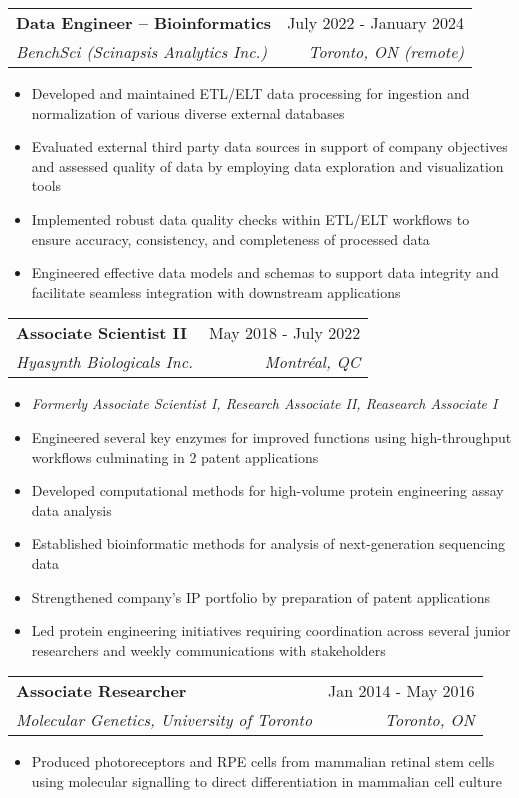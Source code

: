 \documentclass[letterpaper,11pt]{article}
\makeatletter
\newcommand{\resumeItem}[1]{
  \item\small{
    {#1 \vspace{-2pt}}
  }
}
\newcommand{\resumeSubheading}[4]{
  \vspace{-2pt}\item
    \begin{tabular*}{0.97\textwidth}[t]{l@{\extracolsep{\fill}}r}
      \textbf{#1} & #2 \\
      \textit{\small#3} & \textit{\small #4} \\
    \end{tabular*}\vspace{-7pt}
}
\newcommand{\resumeSubSubheading}[2]{
    \item
    \begin{tabular*}{0.97\textwidth}{l@{\extracolsep{\fill}}r}
      \textit{\small#1} & \textit{\small #2} \\
    \end{tabular*}\vspace{-7pt}
}
\newcommand{\resumeSubHeadingListEnd}{\end{itemize}}
\newcommand{\resumeItemListStart}{\begin{itemize}}
\newcommand{\resumeItemListEnd}{\end{itemize}\vspace{-5pt}}
\makeatother
\begin{document}
    \resumeSubheading
      {Data Engineer -- Bioinformatics}{July 2022 - January 2024}
      {BenchSci (Scinapsis Analytics Inc.)}{Toronto, ON \emph(remote)}
      \resumeItemListStart
        \resumeItem{Developed and maintained ETL/ELT data processing for ingestion and normalization of various diverse external databases}
        \resumeItem{Evaluated external third party data sources in support of company objectives and assessed quality of data by employing data exploration and visualization tools}
	  \resumeItem{Implemented robust data quality checks within ETL/ELT workflows to ensure accuracy, consistency, and completeness of processed data}
        \resumeItem{Engineered effective data models and schemas to support data integrity and facilitate seamless integration with downstream applications}
    \resumeItemListEnd 

      

    \resumeSubheading
      {Associate Scientist II}{May 2018 - July 2022}
      {Hyasynth Biologicals Inc.}{Montréal, QC}
      \resumeItemListStart
		\resumeItem{\emph{Formerly Associate Scientist I, Research Associate II, Reasearch Associate I}}
		\resumeItem{Engineered several key enzymes for improved functions using high-throughput workflows culminating in 2 patent applications}        	
		\resumeItem{Developed computational methods for high-volume protein engineering assay data analysis}
		\resumeItem{Established bioinformatic methods for analysis of next-generation sequencing data}
        	\resumeItem{Strengthened company's IP portfolio by preparation of patent applications}
        	\resumeItem{Led protein engineering initiatives requiring coordination across several junior researchers and weekly communications with stakeholders}
		
    \resumeItemListEnd

    \resumeSubheading
      {Associate Researcher}{Jan 2014 - May 2016}
      {Molecular Genetics, University of Toronto}{Toronto, ON}
      \resumeItemListStart
        \resumeItem{Produced photoreceptors and RPE cells from mammalian retinal stem cells using molecular signalling to direct differentiation in mammalian cell culture}
      \resumeItemListEnd
%
\end{document}
